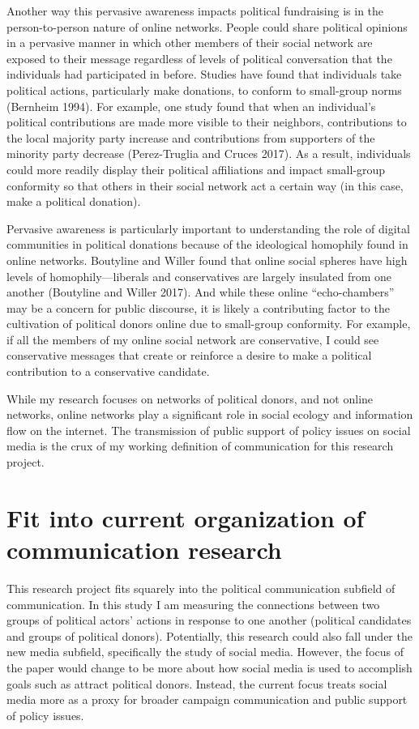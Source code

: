 \documentclass[12pt,]{article}
\begin{document}
Another way this pervasive awareness impacts political fundraising is in
the person-to-person nature of online networks. People could share
political opinions in a pervasive manner in which other members of their
social network are exposed to their message regardless of levels of
political conversation that the individuals had participated in before.
Studies have found that individuals take political actions, particularly
make donations, to conform to small-group norms (Bernheim 1994). For
example, one study found that when an individual's political
contributions are made more visible to their neighbors, contributions to
the local majority party increase and contributions from supporters of
the minority party decrease (Perez-Truglia and Cruces 2017). As a
result, individuals could more readily display their political
affiliations and impact small-group conformity so that others in their
social network act a certain way (in this case, make a political
donation).

Pervasive awareness is particularly important to understanding the role
of digital communities in political donations because of the ideological
homophily found in online networks. Boutyline and Willer found that
online social spheres have high levels of homophily---liberals and
conservatives are largely insulated from one another (Boutyline and
Willer 2017). And while these online ``echo-chambers'' may be a concern
for public discourse, it is likely a contributing factor to the
cultivation of political donors online due to small-group conformity.
For example, if all the members of my online social network are
conservative, I could see conservative messages that create or reinforce
a desire to make a political contribution to a conservative candidate.

While my research focuses on networks of political donors, and not
online networks, online networks play a significant role in social
ecology and information flow on the internet. The transmission of public
support of policy issues on social media is the crux of my working
definition of communication for this research project.

\hypertarget{fit-into-current-organization-of-communication-research}{%
\section{Fit into current organization of communication
research}\label{fit-into-current-organization-of-communication-research}}

This research project fits squarely into the political communication
subfield of communication. In this study I am measuring the connections
between two groups of political actors' actions in response to one
another (political candidates and groups of political donors).
Potentially, this research could also fall under the new media subfield,
specifically the study of social media. However, the focus of the paper
would change to be more about how social media is used to accomplish
goals such as attract political donors. Instead, the current focus
treats social media more as a proxy for broader campaign communication
and public support of policy issues.
\end{document}
